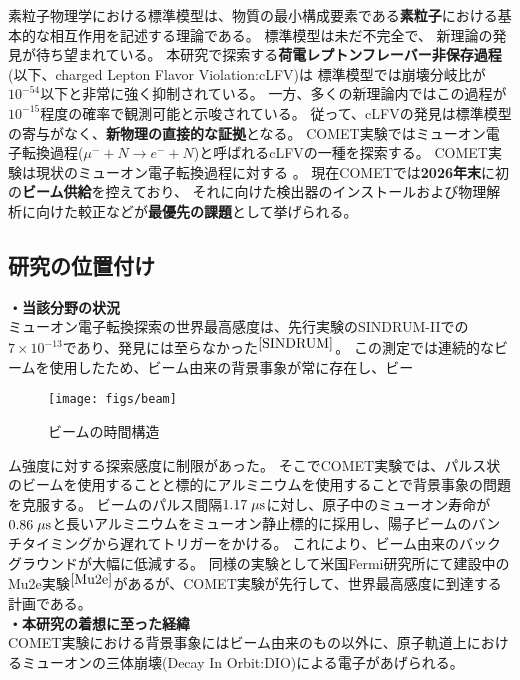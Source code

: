 \documentclass[11pt,a4j,dvipdfmx]{jarticle} 					%
\newcommand{\研究課題名}{COMET Phase-Iに向けたエンジニアリングランおよびその物理解析}
\newcommand{\研究機関名}{大阪大学}
\newcommand{\研究代表者氏名}{高見 翔太   }
\newcommand{\mysubsection}[1]{\vspace{-20pt}\subsection*{\colorbox{cyan!15}{\normalsize{#1}}}\vspace{-0.2cm}}
\begin{document}
素粒子物理学における標準模型は、物質の最小構成要素である\textbf{素粒子}における基本的な相互作用を記述する理論である。
標準模型は未だ不完全で、%
新理論の発見が待ち望まれている。
本研究で探索する\textbf{荷電レプトンフレーバー非保存過程}(以下、charged Lepton Flavor Violation:cLFV)は
標準模型では崩壊分岐比が$10^{-54}$以下と非常に強く抑制されている。
一方、多くの新理論内ではこの過程が$10^{-15}$程度の確率で観測可能と示唆されている。
従って、cLFVの発見は標準模型の寄与がなく、\textbf{新物理の直接的な証拠}となる。
COMET実験ではミューオン電子転換過程($\mu^- + N \rightarrow e^- + N$)と呼ばれるcLFVの一種を探索する。
COMET実験は現状のミューオン電子転換過程に対する 。
現在COMETでは\textbf{2026年末}に初の\textbf{ビーム供給}を控えており、
それに向けた検出器のインストールおよび物理解析に向けた較正などが\textbf{最優先の課題}として挙げられる。
\mysubsection{研究の位置付け}
\noindent \textbf{・当該分野の状況}\\
ミューオン電子転換探索の世界最高感度は、先行実験のSINDRUM-I\hspace{-1.2pt}Iでの$7 \times 10^{-13}$であり、発見には至らなかった$^{\cite{SINDRUM}}$。
この測定では連続的なビームを使用したため、ビーム由来の背景事象が常に存在し、ビー
\begin{wrapfigure}[9]{r}{190pt}{}
	\centering
	 \vspace{-0.5cm}
	 \hspace*{-15pt}
	 \texttt{[image: figs/beam]}
	 \vspace{-1.2cm}
	 \caption{\small{ビームの時間構造}}
	 \label{Fig:beam}
	\end{wrapfigure} 
ム強度に対する探索感度に制限があった。
そこでCOMET実験では、パルス状のビームを使用することと標的にアルミニウムを使用することで背景事象の問題を克服する。
ビームのパルス間隔$1.17\;\rm{\mu s}$に対し、原子中のミューオン寿命が$0.86\;\rm{\mu s}$と長いアルミニウムをミューオン静止標的に採用し、陽子ビームのバンチタイミングから遅れてトリガーをかける。
これにより、ビーム由来のバックグラウンドが大幅に低減する。
同様の実験として米国Fermi研究所にて建設中のMu2e実験$^{\cite{Mu2e}}$があるが、COMET実験が先行して、世界最高感度に到達する計画である。\\
\noindent \textbf{・本研究の着想に至った経緯}\\
COMET実験における背景事象にはビーム由来のもの以外に、原子軌道上におけるミューオンの三体崩壊(Decay In Orbit:DIO)による電子があげられる。
\end{document}
